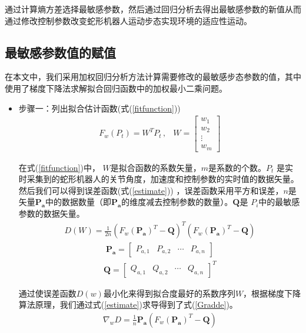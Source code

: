 通过计算熵方差选择最敏感参数，然后通过回归分析去得出最敏感参数的新值从而通过修改控制参数改变蛇形机器人运动步态实现环境的适应性运动。

\subsection{最敏感参数值的赋值}
在本文中，我们采用加权回归分析方法计算需要修改的最敏感步态参数的值，其中使用了梯度下降法求解拟合回归函数中的加权最小二乘问题。

\begin{itemize}
	\item 步骤一：列出拟合估计函数(式(\ref{fitfunction}))
	\begin{eqnarray}\label{fitfunction}
	F_{w}(P_{t})=W^{T}P_{t}\,,&W=\begin{bmatrix}w_{1}\\ w_{2}\\ \vdots \\ w_{m}\end{bmatrix}
	\end{eqnarray}
	
	在式(\ref{fitfunction})中， $W$是拟合函数的系数矢量，$m$是系数的个数。$P_{t}$ 是实时采集到的蛇形机器人的关节角度，加速度和控制参数的实时值的数据矢量。然后我们可以得到误差函数(式(\ref{estimate})) ，误差函数采用平方和误差，$n$是矢量$\bm{P_{a}}$中的数据数量（即$\bm{P_{a}}$的维度减去控制参数的数量）。$\bm{Q}$是 $P_{i}$中的最敏感参数的数据矢量。
	\begin{eqnarray}\label{estimate}
	D(W)=\frac{1}{2n}(F_{w}(\bm{P_{a}})^{T}-\bm{Q})^{T}(F_{w}(\bm{P_{a}})^{T}-\bm{Q})
	\end{eqnarray}
	\begin{eqnarray}
	\bm{P_{a}}=\begin{bmatrix}P_{a,1}&P_{a,2}  &\cdots  &P_{a,n} \end{bmatrix}
	\end{eqnarray}
	\begin{eqnarray}
	\bm{Q}=\begin{bmatrix}Q_{a,1}& Q_{a,2}& \cdots & Q_{a,n}\end{bmatrix}^{T}
	\end{eqnarray}
	
	通过使误差函数$D(w)$最小化来得到拟合度最好的系数序列$W$，根据梯度下降算法原理，我们通过式(\ref{estimate})求导得到了式(\ref{Gradde})。
	\begin{eqnarray}\label{Gradde}
	\nabla_{w}D=\frac{1}{n}\bm{P_{a}}(F_{w}(\bm{P_{a}})^{T}-\bm{Q})
	\end{eqnarray}
	

\end{itemize}
